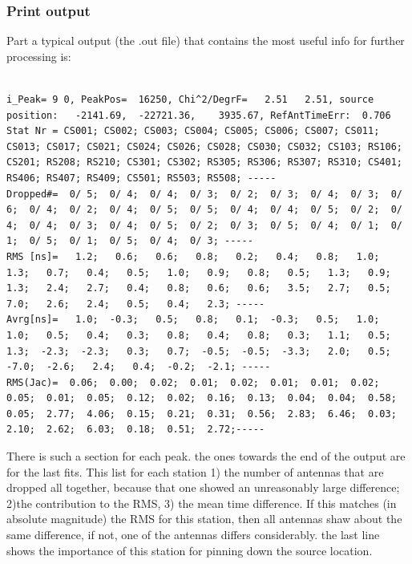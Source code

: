 \clearpage
\subsubsection{Print output}

Part a typical output (the .out file) that contains the most useful info for further processing is:

\begin{linenumbers}
\tiny
\resetlinenumber
\begin{verbatim}

i_Peak= 9 0, PeakPos=  16250, Chi^2/DegrF=   2.51   2.51, source position:   -2141.69,  -22721.36,    3935.67, RefAntTimeErr:  0.706
Stat Nr = CS001; CS002; CS003; CS004; CS005; CS006; CS007; CS011; CS013; CS017; CS021; CS024; CS026; CS028; CS030; CS032; CS103; RS106; CS201; RS208; RS210; CS301; CS302; RS305; RS306; RS307; RS310; CS401; RS406; RS407; RS409; CS501; RS503; RS508; -----
Dropped#=  0/ 5;  0/ 4;  0/ 4;  0/ 3;  0/ 2;  0/ 3;  0/ 4;  0/ 3;  0/ 6;  0/ 4;  0/ 2;  0/ 4;  0/ 5;  0/ 5;  0/ 4;  0/ 4;  0/ 5;  0/ 2;  0/ 4;  0/ 4;  0/ 3;  0/ 4;  0/ 5;  0/ 2;  0/ 3;  0/ 5;  0/ 4;  0/ 1;  0/ 1;  0/ 5;  0/ 1;  0/ 5;  0/ 4;  0/ 3; -----
RMS [ns]=   1.2;   0.6;   0.6;   0.8;   0.2;   0.4;   0.8;   1.0;   1.3;   0.7;   0.4;   0.5;   1.0;   0.9;   0.8;   0.5;   1.3;   0.9;   1.3;   2.4;   2.7;   0.4;   0.8;   0.6;   0.6;   3.5;   2.7;   0.5;   7.0;   2.6;   2.4;   0.5;   0.4;   2.3; -----
Avrg[ns]=   1.0;  -0.3;   0.5;   0.8;   0.1;  -0.3;   0.5;   1.0;   1.0;   0.5;   0.4;   0.3;   0.8;   0.4;   0.8;   0.3;   1.1;   0.5;   1.3;  -2.3;  -2.3;   0.3;   0.7;  -0.5;  -0.5;  -3.3;   2.0;   0.5;  -7.0;  -2.6;   2.4;   0.4;  -0.2;  -2.1; -----
RMS(Jac)=  0.06;  0.00;  0.02;  0.01;  0.02;  0.01;  0.01;  0.02;  0.05;  0.01;  0.05;  0.12;  0.02;  0.16;  0.13;  0.04;  0.04;  0.58;  0.05;  2.77;  4.06;  0.15;  0.21;  0.31;  0.56;  2.83;  6.46;  0.03;  2.10;  2.62;  6.03;  0.18;  0.51;  2.72;-----
\end{verbatim}
\end{linenumbers}

There is such a section for each peak. the ones towards the end of the output are for the last fits. This list for each station 1) the number of antennas that are dropped all together, because that one showed an unreasonably large difference; 2)the contribution to the RMS, 3) the mean time difference. If this matches (in absolute magnitude) the RMS for this station, then all antennas shaw about the same difference, if not, one of the antennas differs considerably. the last line shows the importance of this station for pinning down the source location.

